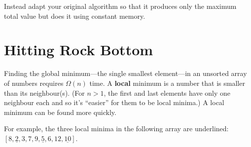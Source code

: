 \documentclass[11pt, oneside]{article}   	%
\theoremstyle{definition}
\theoremstyle{remark}
\begin{document}
Instead adapt your original algorithm so that it produces only the
maximum total value but does it using constant memory.
\section{Hitting Rock Bottom}
\label{sec-3}

Finding the global minimum---the single smallest element---in an
unsorted array of numbers requires $\Omega(n)$ time.  A \textbf{local}
minimum is a number that is smaller than its neighbour(s). (For $n>1$,
the first and last elements have only one neighbour each and so it's
``easier'' for them to be local minima.) A local minimum can be found
more quickly.

For example, the three local minima in the following array are
underlined: $[8, \underline{2}, 3, 7, 9, \underline{5}, 6, 12,
\underline{10}]$.
\end{document}
